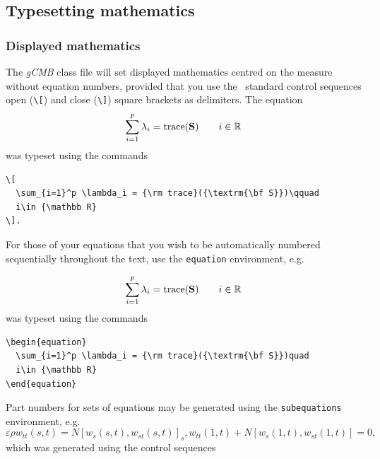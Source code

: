 \documentclass{gCMB2e}
\begin{document}
\subsection{Typesetting mathematics}\label{TMth}

\subsubsection{Displayed mathematics}

The {\it gCMB} class file will set displayed mathematics centred on the measure without equation numbers, provided
that you use the \LaTeXe\ standard control sequences open (\verb"\[") and close (\verb"\]") square brackets as
delimiters. The equation
\[
  \sum_{i=1}^p \lambda_i = {\rm trace}({\textrm{\bf S}})\qquad
  i\in {\mathbb R}
\]
%
was typeset using the commands
%
\begin{verbatim}
\[
  \sum_{i=1}^p \lambda_i = {\rm trace}({\textrm{\bf S}})\qquad
  i\in {\mathbb R}
\].
\end{verbatim}

For those of your equations that you wish to be automatically
numbered sequentially throughout the text, use the {\tt{equation}}
environment, e.g.

\begin{equation}
  \sum_{i=1}^p \lambda_i = {\rm trace}({\textrm{\bf S}})\qquad
  i\in {\mathbb R}
\end{equation}
%
was typeset using the commands

\begin{verbatim}
\begin{equation}
  \sum_{i=1}^p \lambda_i = {\rm trace}({\textrm{\bf S}})quad
  i\in {\mathbb R}
\end{equation}
\end{verbatim}

Part numbers for sets of equations may be generated using the
{\tt{subequations}} environment, e.g.
\begin{subequations} \label{subeqnexample}
\begin{equation}
        \varepsilon \rho w_{tt}(s,t)
        =
        N[w_{s}(s,t),w_{st}(s,t)]_{s},
        \label{subeqnpart}
\end{equation}
\begin{equation}
        w_{tt}(1,t)+N[w_{s}(1,t),w_{st}(1,t)] = 0,
\end{equation}
\end{subequations}
which was generated using the control sequences
\end{document}
